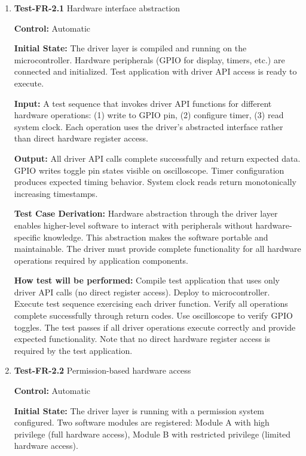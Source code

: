 \documentclass[12pt, titlepage]{article}
\begin{document}
\begin{enumerate}

\item{\textbf{Test-FR-2.1} Hardware interface abstraction \\}

\textbf{Control:} Automatic
					
\textbf{Initial State:} 
The driver layer is compiled and running on the microcontroller. Hardware
peripherals (GPIO for display, timers, etc.) are connected and initialized. Test
application with driver API access is ready to execute.
					
\textbf{Input:}
A test sequence that invokes driver API functions for different hardware
operations: (1) write to GPIO pin, (2) configure
timer, (3) read system clock. Each operation uses the driver's abstracted
interface rather than direct hardware register access.
					
\textbf{Output:}
All driver API calls complete successfully and return expected data.
GPIO writes toggle pin states visible on
oscilloscope. Timer configuration produces expected timing behavior. System
clock reads return monotonically increasing timestamps. 

\textbf{Test Case Derivation:} 
Hardware abstraction through the driver layer enables higher-level software to
interact with peripherals without hardware-specific knowledge. This abstraction
makes the software portable and maintainable. The driver must provide complete
functionality for all hardware operations required by application components.
					
\textbf{How test will be performed:}
Compile test application that uses only driver API calls (no direct register
access). Deploy to microcontroller. Execute test sequence exercising each driver
function. Verify all operations complete successfully through return codes. Use
oscilloscope to verify GPIO toggles.
The test passes if all driver operations execute
correctly and provide expected functionality. Note that no direct hardware
register access is required by the test application.

\item{\textbf{Test-FR-2.2} Permission-based hardware access\\}

\textbf{Control:} Automatic
					
\textbf{Initial State:} 
The driver layer is running with a permission system configured. Two software
modules are registered: Module A with high privilege (full hardware access),
Module B with restricted privilege (limited hardware access).
					

\end{enumerate}
\end{document}
